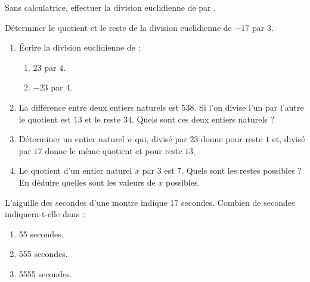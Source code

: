\begin{exstheorie}
\renewcommand{\eexo}{\vspace{4mm}}
\exo
Sans calculatrice, effectuer la division euclidienne de  par .


\eexo
\pagebreak[3]



\exo
Déterminer le quotient et le reste de la division euclidienne de $-17$ par $3$.


\eexo
\pagebreak[3]

\exo

\vspace{-0.8cm}
\begin{enumerate}
	\item[\textbf{a)}] Écrire la division euclidienne de : 
	\begin{enumerate}
		\item[\textbf{1)}] $23$ par $4$.
		\item[\textbf{2)}] $-23$ par $4$.
	\end{enumerate}
	
	\item[\textbf{b)}] La différence entre deux entiers naturels est $538$. Si l'on divise l'un par l'autre le quotient est $13$ et le reste $34$. Quels sont ces deux entiers naturels ?
	
	\item[\textbf{c)}] Déterminer un entier naturel $n$ qui, divisé par $23$ donne pour reste $1$ et, divisé par $17$ donne le même quotient et pour reste $13$.
	
	\item[\textbf{d)}] Le quotient d'un entier naturel $x$ par $3$ est $7$. Quels sont les restes possibles ? \\
	En déduire quelles sont les valeurs de $x$ possibles.
\end{enumerate}

\eexo
\pagebreak[3]


\exo
L'aiguille des secondes d'une montre indique 17 secondes. Combien de secondes indiquera-t-elle dans :
\begin{enumerate}[label=\alph*),itemsep=0mm,left=0mm]
\item 55 secondes.
\item 555 secondes.
\item 5555 secondes.
\end{enumerate}



\eexo
\pagebreak[3]


\end{exstheorie}
